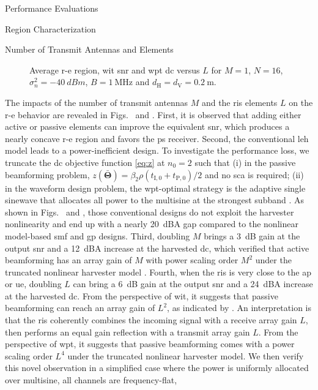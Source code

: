 \begin{section}{Performance Evaluations}
\begin{subsection}{ Region Characterization}
\begin{subsubsection}{Number of Transmit Antennas and  Elements}
			\begin{figure}[H]
				\centering
				\caption{Average \gls{r-e} region, \gls{wit} \gls{snr} and \gls{wpt} \gls{dc} versus $L$ for $M=1$, $N=16$, $\sigma_n^2=\qty{-40}{dBm}$, $B=\qty{1}{\MHz}$ and $d_{\mathrm{H}}=d_{\mathrm{V}}=\qty{0.2}{\meter}$.}
			\end{figure}

			The impacts of the number of transmit antennas $M$ and the \gls{ris} elements $L$ on the \gls{r-e} behavior are revealed in Figs.~ and . First, it is observed that adding either active or passive elements can improve the equivalent \gls{snr}, which produces a nearly concave \gls{r-e} region and favors the \gls{ps} receiver. Second, the conventional \gls{leh} model leads to a power-inefficient design. To investigate the performance loss, we truncate the \gls{dc} objective function \eqref{eq:z} at $n_0=2$ such that (i) in the passive beamforming problem, $z(\bar{\mathbf{\Theta}}) = {\beta_2}{\rho}(t_{\mathrm{I},0}+t_{\mathrm{P},0})/2$ and no \gls{sca} is required; (ii) in the waveform design problem, the \gls{wpt}-optimal strategy is the adaptive single sinewave that allocates all power to the multisine at the strongest subband \cite{Clerckx2016a}. As shown in Figs.~ and , those conventional designs do not exploit the harvester nonlinearity and end up with a nearly \qty{20}{dBA} gap compared to the nonlinear model-based \gls{smf} and \gls{gp} designs. Third, doubling $M$ brings a \qty{3}{\dB} gain at the output \gls{snr} and a \qty{12}{dBA} increase at the harvested \gls{dc}, which verified that active beamforming has an array gain of $M$ \cite{Tse2005} with power scaling order $M^2$ under the truncated nonlinear harvester model \cite{Clerckx2016a,Clerckx2018b}. Fourth, when the \gls{ris} is very close to the \gls{ap} or \gls{ue}, doubling $L$ can bring a \qty{6}{\dB} gain at the output \gls{snr} and a \qty{24}{dBA} increase at the harvested \gls{dc}. From the perspective of \gls{wit}, it suggests that passive beamforming can reach an array gain of $L^2$, as indicated by \cite{Wu2019}. An interpretation is that the \gls{ris} coherently combines the incoming signal with a receive array gain $L$, then performs an equal gain reflection with a transmit array gain $L$. From the perspective of \gls{wpt}, it suggests that passive beamforming comes with a power scaling order $L^4$ under the truncated nonlinear harvester model. We then verify this novel observation in a simplified case where the power is uniformly allocated over multisine, all channels are frequency-flat, 
\end{subsubsection}
\end{subsection}
\end{section}

